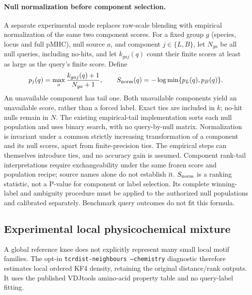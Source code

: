 \documentclass[10pt,a4paper]{article}
\theoremstyle{definition}
\newcommand{\code}[1]{\texttt{\small #1}}
\begin{document}
\paragraph{Null normalization before component selection.}
A separate experimental mode replaces raw-scale blending with empirical
normalization of the same two component scores. For a fixed group $g$
(species, locus and full pMHC), null source $a$, and component $j\in\{L,B\}$,
let $N_{ga}$ be all null queries, including no-hits, and let
$k_{gaj}(q)$ count their finite scores at least as large as the query's
finite score. Define
\[
 p_j(q)=\max_a\frac{k_{gaj}(q)+1}{N_{ga}+1},\qquad
 S_{\rm norm}(q)=-\log\min\{p_L(q),p_B(q)\}.
\]
An unavailable component has tail one. Both unavailable components yield
an unavailable score, rather than a forced label. Exact ties are included
in $k$; no-hit nulls remain in $N$. The existing empirical-tail implementation
sorts each null population and uses binary search, with no query-by-null
matrix. Normalization is invariant under a common strictly increasing
transformation of a component and its null scores, apart from finite-precision
ties. The empirical steps can themselves introduce ties, and no accuracy
gain is assumed. Component rank-tail interpretations require exchangeability
under the same frozen score and population recipe; source names alone do
not establish it. $S_{\rm norm}$ is a ranking statistic, not a P-value for
component or label selection. Its complete winning-label and ambiguity
procedure must be applied to the authorized null populations and calibrated
separately. Benchmark query outcomes do not fit this formula.

\subsection{Experimental local physicochemical mixture}
A global reference knee does not explicitly represent many small local motif
families. The opt-in \code{tcrdist-neighbours --chemistry} diagnostic therefore
estimates local ordered KF4 density, retaining the original distance/rank outputs.
It uses the published VDJtools amino-acid property table and no query-label fitting.
\end{document}
